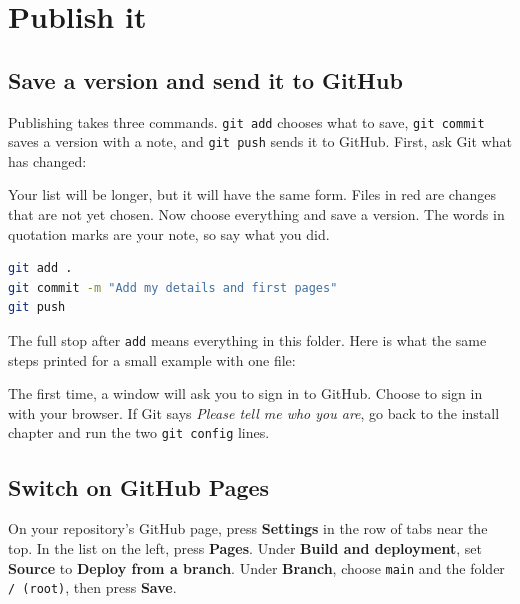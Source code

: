 \chapter{Publish it}
\label{ch:publish}

\section{Save a version and send it to GitHub}

Publishing takes three commands. \texttt{git add} chooses what to save, \texttt{git commit} saves a version with a note, and \texttt{git push} sends it to GitHub. First, ask Git what has changed:



Your list will be longer, but it will have the same form. Files in red are changes that are not yet chosen. Now choose everything and save a version. The words in quotation marks are your note, so say what you did.

\begin{lstlisting}[language=bash]
git add .
git commit -m "Add my details and first pages"
git push
\end{lstlisting}

The full stop after \texttt{add} means everything in this folder. Here is what the same steps printed for a small example with one file:





The first time, a window will ask you to sign in to GitHub. Choose to sign in with your browser. If Git says \emph{Please tell me who you are}, go back to the install chapter and run the two \texttt{git config} lines.

\section{Switch on GitHub Pages}

On your repository's GitHub page, press \textbf{Settings} in the row of tabs near the top. In the list on the left, press \textbf{Pages}. Under \textbf{Build and deployment}, set \textbf{Source} to \textbf{Deploy from a branch}. Under \textbf{Branch}, choose \texttt{main} and the folder \texttt{/ (root)}, then press \textbf{Save}.


